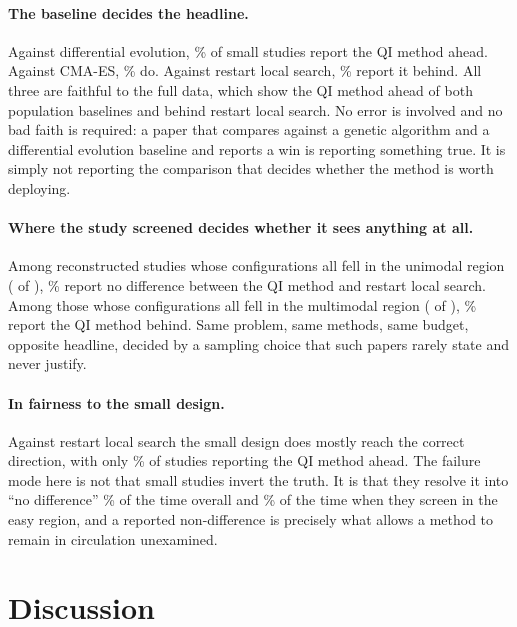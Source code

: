 \documentclass[runningheads]{llncs}
\begin{document}
\paragraph{The baseline decides the headline.}
Against differential evolution, \numSmallDeAhead\% of small studies report the QI method ahead.
Against CMA-ES, \numSmallCmaesAhead\% do. Against restart local search,
\numSmallRestartBehind\% report it behind. All three are faithful to the full data, which show
the QI method ahead of both population baselines and behind restart local search. No error is
involved and no bad faith is required: a paper that compares against a genetic algorithm and a
differential evolution baseline and reports a win is reporting something true. It is simply not
reporting the comparison that decides whether the method is worth deploying.

\paragraph{Where the study screened decides whether it sees anything at all.}
Among reconstructed studies whose \numStudyCells{} configurations all fell in the unimodal region
(\numAllUniN{} of \numStudies{}), \numAllUniTie\% report no difference between the QI method and
restart local search. Among those whose configurations all fell in the multimodal region
(\numAllMultiN{} of \numStudies{}), \numAllMultiBehind\% report the QI method behind. Same
problem, same methods, same budget, opposite headline, decided by a sampling choice that such
papers rarely state and never justify.

\paragraph{In fairness to the small design.}
Against restart local search the small design does mostly reach the correct direction, with only
\numSmallRestartAhead\% of studies reporting the QI method ahead. The failure mode here is not
that small studies invert the truth. It is that they resolve it into ``no difference''
\numSmallRestartTie\% of the time overall and \numAllUniTie\% of the time when they screen in the
easy region, and a reported non-difference is precisely what allows a method to remain in
circulation unexamined.

\section{Discussion}
\label{sec:discussion}
\end{document}
